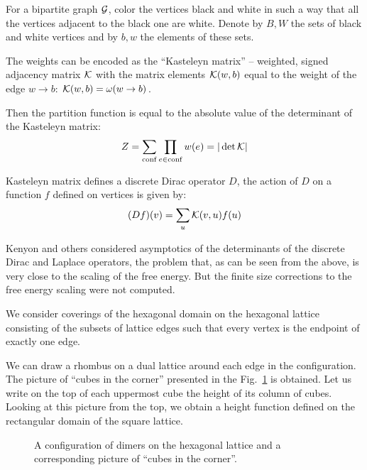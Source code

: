 \documentclass{article}
\begin{document}
For a bipartite graph ${\cal G}$, color the vertices black and white in such a way that all the
vertices adjacent to the black one are white. Denote by $B, W$ the sets of black and white
vertices and by $b,w$ the elements of these sets. 

The weights can be encoded as the ``Kasteleyn matrix'' -- weighted, signed adjacency matrix ${\cal K}$ with
the matrix elements ${\cal K}(w,b)$ equal to the weight of the edge $w\to b$: ${\cal K}(w,b)=\omega(w\to b)$.

Then the partition function is equal to the absolute value of the determinant of the Kasteleyn
matrix\cite{P.W-1961,doi:10.1080/14786436108243366}: 
\begin{equation}
  \label{eq:15}
  Z=\sum_{\mathrm{conf}}\prod_{e\in \mathrm{conf}}w(e)=|\det {\cal K}|
\end{equation}

Kasteleyn matrix defines a discrete Dirac operator $D$, the action of $D$ on a function $f$ defined
on vertices is given by:
\begin{equation}
  \label{eq:16}
  (Df)(v)=\sum_{u}{\cal K}(v,u) f(u)
\end{equation}

Kenyon \cite{kenyon2002laplacian,kenyon2000asymptotic} and others \cite{sridhar2015asymptotic}
considered asymptotics of the determinants of the discrete Dirac and Laplace operators, the problem
that, as can be seen from the above, is very close to the scaling of the free energy. But the finite
size corrections to the free energy scaling were not computed. 
  
We consider coverings of the hexagonal domain on the hexagonal lattice consisting of the subsets of
lattice edges such that every vertex is the endpoint of exactly one edge.

We can draw a rhombus on a dual lattice around each edge in the configuration. The picture of
``cubes in the corner'' presented in the Fig.~\ref{dhf} is obtained. Let us write on the top of each
uppermost cube the height of its column of cubes. Looking at this picture from the top, we obtain a
height function defined on the rectangular domain of the square lattice. 

\begin{figure}[htbp]
\caption{\label{dhf}A configuration of dimers on the hexagonal lattice and a corresponding picture
  of ``cubes in the corner''.}
\end{figure}
\end{document}
